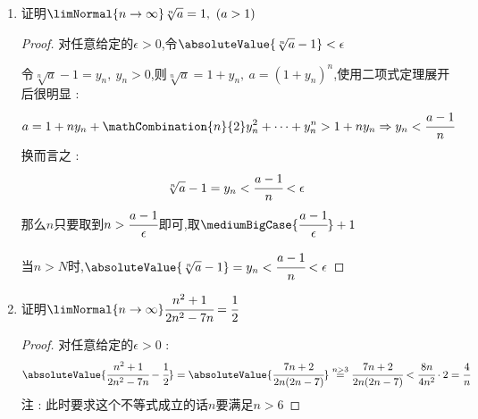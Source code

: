{{{{\begin{enumerate}
{\begin{proof}
                      于是$N$只要取任意大于这玩意的正整数即可,取$N = max\bigCase{\mediumBigCase{\cfrac{\lg \epsilon}{\lg \absoluteValue{q}}},1}$当$n > N$时,$\absoluteValue{q^n - 0} = \absoluteValue{q^n} < \epsilon$

                  \end{proof}

                  注 : 根据对数列极限的定义的讨论,$N$取的太大没啥意义,可以只考虑绝对值很小的$\epsilon > 0$,不妨考虑任意给定的$0 < \epsilon < \absoluteValue{q}$.则$N$可取为$\mediumBigCase{\cfrac{\lg \epsilon}{\lg \absoluteValue{q}}}$,即$\mediumBigCase{\log_{\absoluteValue{q}}\epsilon}$,当$n > N$时,成立$\absoluteValue{q^n - 0} < \epsilon$

                  根据数列极限的定义来证明某一数列收敛,其关键是对任意给定的$\epsilon > 0$寻找正整数$N$.在上面的立体中,$N$都是通过解不等式$\absoluteValue{x_n - a} < \epsilon$来得出的.但在大多数情况下,这个不等式并不容易解.实际上,数列极限的定义并不要求取到最好的$N$,所以在证明中常常对$\absoluteValue{x_n - a}$适度的做一些放大处理,这是种常用的技巧.以下是一些例子,描述了怎么使用这个技巧 :
                  }
            \item {
                  证明$\limNormal{n \to \infty}\sqrt[n]{a} = 1,\ (a > 1)$

                  \begin{proof}
                      对任意给定的$\epsilon > 0$,令$\absoluteValue{\sqrt[n]{a} - 1} < \epsilon$

                      令$\sqrt[n]{a} - 1 = y_n,\ y_n > 0$,则$\sqrt[n]{a} = 1 + y_n,\ a = (1 + y_n)^n$,使用二项式定理展开后很明显 : $$
                          a = 1 + ny_n + \mathCombination{n}{2}y^2_n +  \dots + y^n_n > 1 + ny_n \Rightarrow y_n < \cfrac{a - 1}{n}
                      $$
                      换而言之 : $$
                          \sqrt[n]{a} - 1 = y_n < \cfrac{a - 1}{n} < \epsilon
                      $$
                      那么$n$只要取到$n > \cfrac{a - 1}{\epsilon}$即可,取$\mediumBigCase{\cfrac{a - 1}{\epsilon}} + 1$

                      当$n > N$时,$\absoluteValue{\sqrt[n]{a} - 1} = y_n < \cfrac{a - 1}{n} < \epsilon$

                  \end{proof}
                  }
            \item {
                  证明$\limNormal{n \to \infty}\cfrac{n^2 + 1}{2n^2 - 7n} = \cfrac{1}{2}$

                  \begin{proof}
                      对任意给定的$\epsilon > 0$ : $$
                          \absoluteValue{\cfrac{n^2 + 1}{2n^2 - 7n} - \cfrac{1}{2}} = \absoluteValue{\cfrac{7n + 2}{2n(2n - 7)}}\stackrel{n > 3}{=}\cfrac{7n + 2}{2n(2n - 7)} < \cfrac{8n}{4n^2} \cdot 2 = \cfrac{4}{n}
                      $$
                      注 : 此时要求这个不等式成立的话$n$要满足$n > 6$


\end{proof}}
\end{enumerate}}}}}
